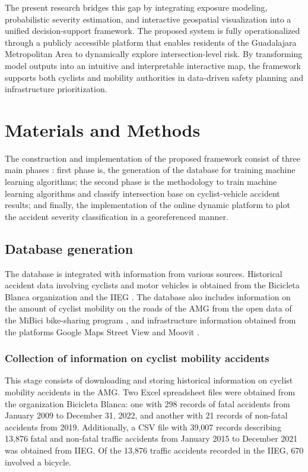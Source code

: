 \documentclass[preprint,12pt]{elsarticle}
\begin{document}
The present research bridges this gap by integrating exposure modeling, probabilistic severity estimation, and interactive geospatial visualization into a unified decision-support framework. The proposed system is fully operationalized through a publicly accessible platform that enables residents of the Guadalajara Metropolitan Area to dynamically explore intersection-level risk. By transforming model outputs into an intuitive and interpretable interactive map, the framework supports both cyclists and mobility authorities in data-driven safety planning and infrastructure prioritization.

\section{Materials and Methods}
The construction and implementation of the proposed framework consist of three main phases : first phase is, the generation of the database for training machine learning algorithms; the second phase is the methodology to train machine learning algorithms and classify intersection base on cyclist-vehicle accident results; and finally, the implementation of the online dynamic platform to plot the accident severity classification in a georeferenced manner.


\subsection{Database generation}
The database is integrated with information from various sources. Historical accident data involving cyclists and motor vehicles is obtained from the Bicicleta Blanca organization \cite{noauthor_datos_nodate} and the IIEG \cite{iieg_mapa_nodate}. The database also includes information on the amount of cyclist mobility on the roads of the AMG from the open data of the MiBici bike-sharing program \cite{noauthor_mibici_nodate}, and infrastructure information obtained from the platforms Google Maps Street View \cite{noauthor_explora_nodate} and Moovit \cite{noauthor_moovit_nodate}. 

\subsubsection{Collection of information on cyclist mobility accidents}
This stage consists of downloading and storing historical information on cyclist mobility accidents in the AMG. Two Excel spreadsheet files were obtained from the organization Bicicleta Blanca: one with 298 records of fatal accidents from January 2009 to December 31, 2022, and another with 21 records of non-fatal accidents from 2019. Additionally, a CSV file with 39,007 records describing 13,876 fatal and non-fatal traffic accidents from January 2015 to December 2021 was obtained from IIEG. Of the 13,876 traffic accidents recorded in the IIEG, 670 involved a bicycle.
\end{document}
